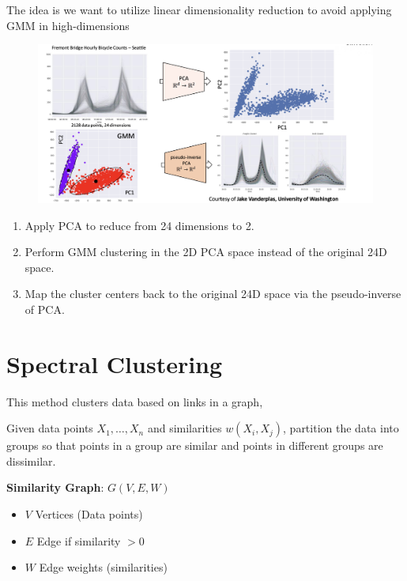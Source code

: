\documentclass[11pt]{article}
\begin{document}
\medskip

The idea is we want to utilize linear dimensionality reduction to avoid applying GMM in high-dimensions

\begin{figure}[h]
	\centering
	\includegraphics[width=1\textwidth]{../imgs/high-low-dim.png} %
\end{figure}

\begin{enumerate}
	\item Apply PCA to reduce from 24 dimensions to 2.

	\item Perform GMM clustering in the 2D PCA space instead of the original 24D space.

	\item Map the cluster centers back to the original 24D space via the pseudo-inverse of PCA.
\end{enumerate}


\section*{Spectral Clustering}
This method clusters data based on links in a graph,

Given data points \( X_1, \dots, X_n \) and similarities \( w(X_i, X_j) \), partition the data into groups so that points in a group are similar and points in different groups are dissimilar.

\medskip

\textbf{Similarity Graph}: \( G(V, E, W) \)
\begin{itemize}
	\item \( V \) Vertices (Data points)
	\item \( E \) Edge if similarity \( > 0 \)
	\item \( W \) Edge weights (similarities)
\end{itemize}
\end{document}
